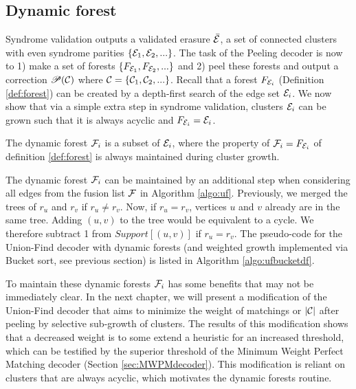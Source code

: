 

\subsection{Dynamic forest}
Syndrome validation outputs a validated erasure $\bar{\mathcal{E}}$, a set of connected clusters with even syndrome parities $\{\mathcal{E}_1, \mathcal{E}_2, ...\}$. The task of the Peeling decoder is now to 1) make a set of forests $\{F_{\mathcal{E}_1}, F_{\mathcal{E}_2}, ...\}$ and 2) peel these forests and output a correction $\mathscr{P}(\mathcal{C})$ where $\mathcal{C} = \{\mathcal{C}_1, \mathcal{C}_2,...\}$. Recall that a forest $F_{\mathcal{E}_i}$ (Definition \ref{def:forest}) can be created by a depth-first search of the edge set $\mathcal{E}_i$. We now show that via a simple extra step in syndrome validation, clusters $\mathcal{E}_i$ can be grown such that it is always acyclic and $F_{\mathcal{E}_i} = \mathcal{E}_i$. 

\begin{definition}
  The dynamic forest $\mathcal{F}_i$ is a subset of $\mathcal{E}_i$, where the property of $\mathcal{F}_i=F_{\mathcal{E}_i}$ of definition \ref{def:forest} is always maintained during cluster growth.
\end{definition}
The dynamic forest $\mathcal{F}_i$ can be maintained by an additional step when considering all edges from the fusion list $\mathcal{F}$ in Algorithm \ref{algo:uf}. Previously, we merged the trees of $r_u$ and $r_v$ if $r_u \neq r_v$. Now, if $r_u = r_v$, vertices $u$ and $v$ already are in the same tree. Adding $(u,v)$ to the tree would be equivalent to a cycle. We therefore subtract 1 from $Support[(u,v)]$ if $r_u = r_v$. The pseudo-code for the Union-Find decoder with dynamic forests (and weighted growth implemented via Bucket sort, see previous section) is listed in Algorithm \ref{algo:ufbucketdf}.

To maintain these dynamic forests $\mathcal{F}_i$ has some benefits that may not be immediately clear. In the next chapter, we will present a modification of the Union-Find decoder that aims to minimize the weight of matchings or $|\mathcal{C}|$ after peeling by selective sub-growth of clusters. The results of this modification shows that a decreased weight is to some extend a heuristic for an increased threshold, which can be testified by the superior threshold of the Minimum Weight Perfect Matching decoder (Section \ref{sec:MWPMdecoder}). This modification is reliant on clusters that are always acyclic, which motivates the dynamic forests routine. 

